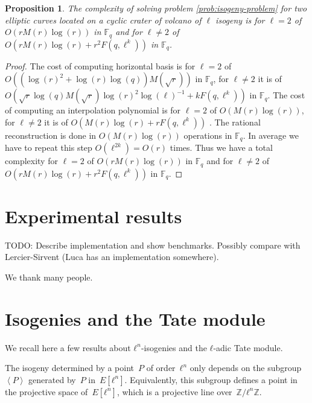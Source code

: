 \documentclass{lms}
\newcommand{\todo}[1]{{\color{red}TODO: #1}}
\newtheorem{prop}[thm]{Proposition}
\def\chev#1{\left\langle#1\right\rangle}
\begin{document}
\begin{prop}
The complexity of solving problem \ref{prob:isogeny-problem} for two elliptic curves located on a cyclic crater of volcano of $\ell$ isogeny is for $\ell=2$ of $O(rM(r)\log(r))$ in $\mathbb{F}_q$ and for $\ell \neq 2$ of $O(rM(r)\log(r)+r^2F(q,\ell^k))$ in $\mathbb{F}_q$.
\end{prop}

\begin{proof}%
The cost of computing horizontal basis is for $\ell=2$ of $O((\log(r)^2+\log(r)\log(q))M(\sqrt{r}))$ in $\mathbb{F}_q$, for $\ell \neq 2$ it is of $O(\sqrt{r}\log(q)M(\sqrt{r})\log(r)^2 \log(\ell)^{-1}+kF(q,\ell^k))$ in $\mathbb{F}_q$.
The cost of computing an interpolation polynomial is for $\ell=2$ of $O(M(r)\log(r))$, for $\ell \neq 2$ it is of $O(M(r)\log(r)+rF(q,\ell^k))$ . The rational reconstruction is done in $O(M(r)\log(r))$ operations in $\mathbb{F}_q$. In average we have to repeat this step $O(\ell^{2k})=O(r)$ times. 
Thus we have a total complexity for $\ell=2$ of  $O(rM(r)\log(r))$ in $\mathbb{F}_q$ and for $\ell \neq 2$ of $O(rM(r)\log(r)+r^2F(q,\ell^k))$ in $\mathbb{F}_q$.
\end{proof}
  
\section{Experimental results}
\label{sec:implem}

\todo{Describe implementation and show benchmarks. Possibly compare
  with Lercier-Sirvent (Luca has an implementation somewhere).}

\begin{acknowledgements}
  We thank many people.
\end{acknowledgements}





\appendix
\section{Isogenies and the Tate module}
\label{ap:Tate}
We recall here a few results about $ℓ^n$-isogenies
and the $ℓ$-adic Tate module.

The isogeny determined by a point~$P$ of order~$ℓ^n$ only depends on
the subgroup~$\chev{P}$ generated by~$P$ in~$E[ℓ^n]$.
Equivalently, this subgroup defines a point in
the projective space of~$E[ℓ^n]$,
which is a projective line over~$ℤ/ℓ^n ℤ$.
\end{document}
